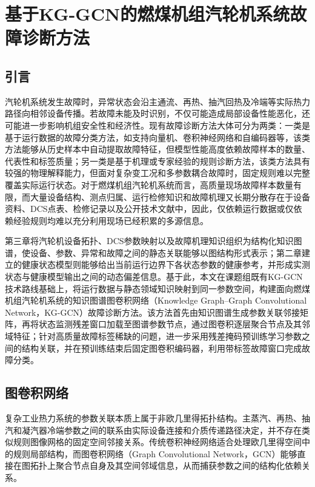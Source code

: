 \section{基于KG-GCN的燃煤机组汽轮机系统故障诊断方法}
\label{sec:kg_gcn_v5}

\subsection{引言}

汽轮机系统发生故障时，异常状态会沿主通流、再热、抽汽回热及冷端等实际热力路径向相邻设备传播。若故障未能及时识别，不仅可能造成局部设备性能恶化，还可能进一步影响机组安全性和经济性。现有故障诊断方法大体可分为两类：一类是基于运行数据的故障分类方法，如支持向量机、卷积神经网络和自编码器等，该类方法能够从历史样本中自动提取故障特征，但模型性能高度依赖故障样本的数量、代表性和标签质量；另一类是基于机理或专家经验的规则诊断方法，该类方法具有较强的物理解释能力，但面对复杂变工况和多参数耦合故障时，固定规则难以完整覆盖实际运行状态。对于燃煤机组汽轮机系统而言，高质量现场故障样本数量有限，而大量设备结构、测点归属、运行检修知识和故障机理又长期分散存在于设备资料、DCS点表、检修记录以及公开技术文献中，因此，仅依赖运行数据或仅依赖经验规则均难以充分利用现场已经积累的多源信息。

第三章将汽轮机设备拓扑、DCS参数映射以及故障机理知识组织为结构化知识图谱，使设备、参数、异常和故障之间的静态关联能够以图结构形式表示；第二章建立的健康状态模型则能够给出当前运行边界下各状态参数的健康参考，并形成实测状态与健康模型输出之间的动态偏差信息。基于此，本文在课题组既有KG-GCN技术路线\cite{YangHaodong2026CFB}基础上，将运行数据与静态领域知识映射到同一参数空间，构建面向燃煤机组汽轮机系统的知识图谱图卷积网络（Knowledge Graph--Graph Convolutional Network，KG-GCN）故障诊断方法。该方法首先由知识图谱生成参数关联邻接矩阵，再将状态监测残差窗口加载至图谱参数节点，通过图卷积逐层聚合节点及其邻域特征；针对高质量故障标签稀缺的问题，进一步采用残差掩码预训练学习参数之间的结构关联，并在预训练结束后固定图卷积编码器，利用带标签故障窗口完成故障分类。

\subsection{图卷积网络}
\label{subsec:gcn_theory_v5}

复杂工业热力系统的参数关联本质上属于非欧几里得拓扑结构。主蒸汽、再热、抽汽和凝汽器冷端参数之间的联系由实际设备连接和介质传递路径决定，并不存在类似规则图像网格的固定空间邻接关系。传统卷积神经网络适合处理欧几里得空间中的规则局部结构，而图卷积网络（Graph Convolutional Network，GCN）能够直接在图拓扑上聚合节点自身及其空间邻域信息，从而捕获参数之间的结构化依赖关系\cite{Kipf2017GCN}。

